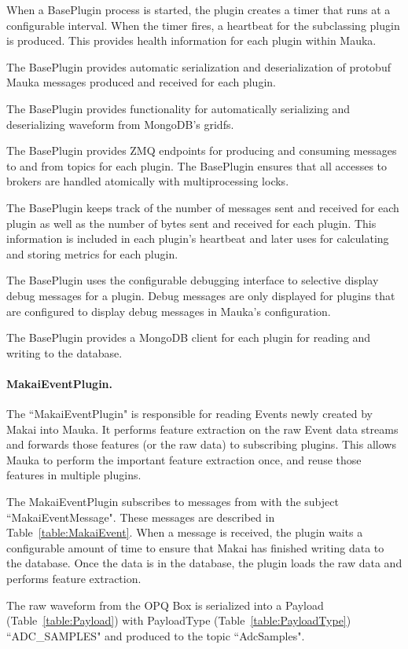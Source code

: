 When a BasePlugin process is started, the plugin creates a timer that runs at a configurable interval. When the timer fires, a heartbeat for the subclassing plugin is produced. This provides health information for each plugin within Mauka.

The BasePlugin provides automatic serialization and deserialization of protobuf Mauka messages produced and received for each plugin.

The BasePlugin provides functionality for automatically serializing and deserializing waveform from MongoDB's gridfs.

The BasePlugin provides ZMQ endpoints for producing and consuming messages to and from topics for each plugin. The BasePlugin ensures that all accesses to brokers are handled atomically with multiprocessing locks.

The BasePlugin keeps track of the number of messages sent and received for each plugin as well as the number of bytes sent and received for each plugin. This information is included in each plugin's heartbeat and later uses for calculating and storing metrics for each plugin.

The BasePlugin uses the configurable debugging interface to selective display debug messages for a plugin. Debug messages are only displayed for plugins that are configured to display debug messages in Mauka's configuration.

The BasePlugin provides a MongoDB client for each plugin for reading and writing to the database.

\paragraph{MakaiEventPlugin.} The ``MakaiEventPlugin" is responsible for reading Events newly created by Makai into Mauka. It performs feature extraction on the raw Event data streams and forwards those features (or the raw data) to subscribing plugins. This allows Mauka to perform the important feature extraction once, and reuse those features in multiple plugins.

The MakaiEventPlugin subscribes to messages from with the subject ``MakaiEventMessage". These messages are described in Table~\ref{table:MakaiEvent}. When a message is received, the plugin waits a configurable amount of time to ensure that Makai has finished writing data to the database. Once the data is in the database, the plugin loads the raw data and performs feature extraction.

The raw waveform from the OPQ Box is serialized into a Payload (Table~\ref{table:Payload}) with PayloadType (Table~\ref{table:PayloadType}) ``ADC\_SAMPLES" and produced to the topic ``AdcSamples".

